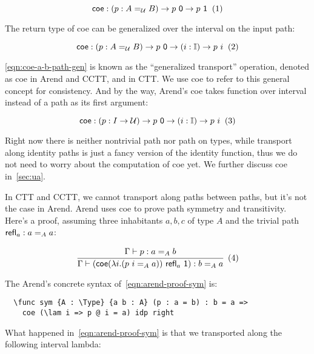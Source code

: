 \[
  \textsf{coe} : (p : A =_{\mathcal U} B) \rightarrow p \ \textsf 0
  \rightarrow p \ \textsf 1
  \xtag \label{eqn:coe-a-b-path}
\]

The return type of \textsf{coe} can be generalized over
the interval on the input path:

\[
  \textsf{coe} : (p : A =_{\mathcal U} B) \rightarrow p \ \textsf 0
  \rightarrow (i : \mathbb I) \rightarrow p \ i
  \xtag \label{eqn:coe-a-b-path-gen}
\]

\ref{eqn:coe-a-b-path-gen} is known as the ``generalized transport''
operation, denoted as \textsf{coe} in Arend and CCTT,
and  in CTT.
We use \textsf{coe} to refer to this general concept for consistency.
And by the way,
Arend's \textsf{coe} takes function over interval instead
of a path as its first argument:

\[
  \textsf{coe} : (p : I \rightarrow \mathcal U)
  \rightarrow p \ \textsf 0
  \rightarrow (i : \mathbb I) \rightarrow p \ i
  \xtag
\]

Right now there is neither nontrivial path nor path on types,
while transport along identity paths is just a fancy version
of the identity function, thus we do not need to worry about the
computation of \textsf{coe} yet.
We further discuss \textsf{coe} in~\cref{sec:ua}.

In CTT and CCTT, we cannot transport along paths between paths,
but it's not the case in Arend.
Arend uses \textsf{coe} to prove path symmetry and transitivity.
Here's a proof, assuming three inhabitants $a, b, c$ of type $A$
and the trivial path $\textsf{refl}_a : a =_A a$:

\[
  \cfrac{
    \Gamma \vdash p : a =_A b
  }{
    \Gamma \vdash (\textsf{coe}
    (\lambda i. (p\ i =_A a)) \ \refl_a \ \textsf 1)
    : b =_A a
  }
  \xtag \label{eqn:arend-proof-sym}
\]

The Arend's concrete syntax of~\ref{eqn:arend-proof-sym} is:

\begin{verbatim}
  \func sym {A : \Type} {a b : A} (p : a = b) : b = a =>
    coe (\lam i => p @ i = a) idp right
\end{verbatim}

What happened in~\ref{eqn:arend-proof-sym} is that we transported
along the following interval lambda:

